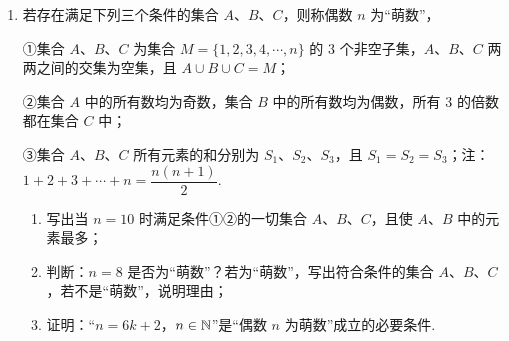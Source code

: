 \documentclass[a4paper,11pt]{article}
\begin{document}
\begin{enumerate}
\begin{enumerate}[label=(\arabic*)]
\item 当 $a=1$ 时，求 $A\cap B$；
\item 试判断是否存在正整数 $a$，使 $A\cap B\neq\varnothing$？若存在，求出 $a$ 的值，若不存在，请说明理由.
\end{enumerate}

\ifanswer
\solbegin
\solend

\fi

\ansspace[6]

\ansneed{7cm}

\item 若存在满足下列三个条件的集合 $A$、$B$、$C$，则称偶数 $n$ 为“萌数”，

①集合 $A$、$B$、$C$ 为集合 $M=\{1,2,3,4,\cdots,n\}$ 的 $3$ 个非空子集，$A$、$B$、$C$ 两两之间的交集为空集，且 $A\cup B\cup C=M$；

②集合 $A$ 中的所有数均为奇数，集合 $B$ 中的所有数均为偶数，所有 $3$ 的倍数都在集合 $C$ 中；

③集合 $A$、$B$、$C$ 所有元素的和分别为 $S_1$、$S_2$、$S_3$，且 $S_1=S_2=S_3$；注：$1+2+3+\cdots+n=\dfrac{n(n+1)}{2}$.

\begin{enumerate}[label=(\arabic*)]
\item 写出当 $n=10$ 时满足条件①②的一切集合 $A$、$B$、$C$，且使 $A$、$B$ 中的元素最多；
\item 判断：$n=8$ 是否为“萌数”？若为“萌数”，写出符合条件的集合 $A$、$B$、$C$，若不是“萌数”，说明理由；
\item 证明：“$n=6k+2$，$n\in\mathbb{N}$”是“偶数 $n$ 为萌数”成立的必要条件.
\end{enumerate}


\end{enumerate}
\end{document}
